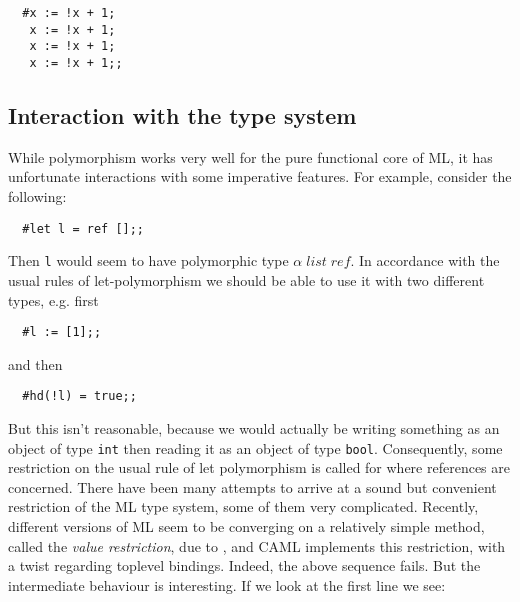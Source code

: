 \begin{boxed}\begin{verbatim}
  #x := !x + 1;
   x := !x + 1;
   x := !x + 1;
   x := !x + 1;;
\end{verbatim}\end{boxed}

\subsection{Interaction with the type system}

While polymorphism works very well for the pure functional core of ML, it has
unfortunate interactions with some imperative features. For example,
consider the following:

\begin{boxed}\begin{verbatim}
  #let l = ref [];;
\end{verbatim}\end{boxed}

Then {\tt l} would seem to have polymorphic type $\alpha\; list\; ref$. In
accordance with the usual rules of let-polymorphism we should be able to use it
with two different types, e.g. first

\begin{boxed}\begin{verbatim}
  #l := [1];;
\end{verbatim}\end{boxed}

\noindent and then

\begin{boxed}\begin{verbatim}
  #hd(!l) = true;;
\end{verbatim}\end{boxed}

But this isn't reasonable, because we would actually be writing something as an
object of type {\tt int} then reading it as an object of type {\tt bool}.
Consequently, some restriction on the usual rule of let polymorphism is called
for where references are concerned. There have been many attempts to arrive at
a sound but convenient restriction of the ML type system, some of them very
complicated. Recently, different versions of ML seem to be converging on a
relatively simple method, called the {\em value restriction}, due to
, and CAML implements this restriction, with a twist
regarding toplevel bindings. Indeed, the above sequence fails. But the
intermediate behaviour is interesting. If we look at the first line we see:

